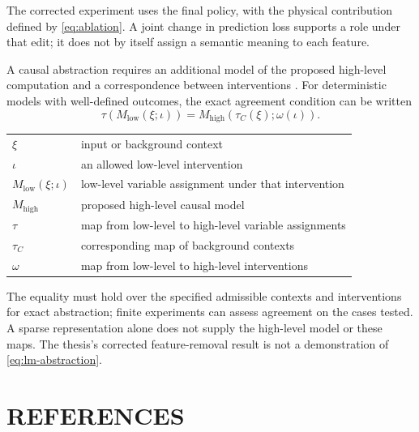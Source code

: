\documentclass[12pt]{report}
\begin{document}
The corrected experiment uses the final policy, with the physical
contribution defined by \eqref{eq:ablation}. A joint change in prediction
loss supports a role under that edit; it does not by itself assign a
semantic meaning to each feature.

A causal abstraction requires an additional model of the proposed
high-level computation and a correspondence between interventions
\cite{geiger2025abstraction}. For deterministic models with well-defined
outcomes, the exact agreement condition can be written
\begin{equation}
\tau\!\left(M_{\mathrm{low}}(\xi;\iota)\right)
 =M_{\mathrm{high}}\!\left(\tau_C(\xi);\omega(\iota)\right).
\label{eq:lm-abstraction}
\end{equation}
\noindent
\begin{tabular}{@{}ll@{}}
$\xi$ & input or background context \\
$\iota$ & an allowed low-level intervention \\
$M_{\mathrm{low}}(\xi;\iota)$ & low-level variable assignment under that intervention \\
$M_{\mathrm{high}}$ & proposed high-level causal model \\
$\tau$ & map from low-level to high-level variable assignments \\
$\tau_C$ & corresponding map of background contexts \\
$\omega$ & map from low-level to high-level interventions
\end{tabular}

The equality must hold over the specified admissible contexts
and interventions for exact abstraction; finite experiments can
assess agreement on the cases tested. A sparse representation
alone does not supply the high-level model or these maps.
The thesis's corrected feature-removal result is not a demonstration
of \eqref{eq:lm-abstraction}.


\FloatBarrier

\chapter*{REFERENCES}
\end{document}
